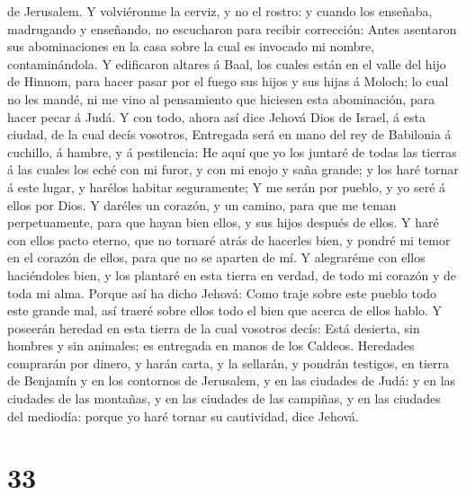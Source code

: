 de Jerusalem.  Y volviéronme la cerviz, y no el rostro: y
cuando los enseñaba, madrugando y enseñando, no escucharon para recibir
corrección:  Antes asentaron sus abominaciones en la casa
sobre la cual es invocado mi nombre, contaminándola.  Y
edificaron altares á Baal, los cuales están en el valle del hijo de
Hinnom, para hacer pasar por el fuego sus hijos y sus hijas á Moloch; lo
cual no les mandé, ni me vino al pensamiento que hiciesen esta
abominación, para hacer pecar á Judá.  Y con todo, ahora
así dice Jehová Dios de Israel, á esta ciudad, de la cual decís
vosotros, Entregada será en mano del rey de Babilonia á cuchillo, á
hambre, y á pestilencia:  He aquí que yo los juntaré de
todas las tierras á las cuales los eché con mi furor, y con mi enojo y
saña grande; y los haré tornar á este lugar, y harélos habitar
seguramente;  Y me serán por pueblo, y yo seré á ellos por
Dios.  Y daréles un corazón, y un camino, para que me teman
perpetuamente, para que hayan bien ellos, y sus hijos después de ellos.
 Y haré con ellos pacto eterno, que no tornaré atrás de
hacerles bien, y pondré mi temor en el corazón de ellos, para que no se
aparten de mí.  Y alegraréme con ellos haciéndoles bien, y
los plantaré en esta tierra en verdad, de todo mi corazón y de toda mi
alma.  Porque así ha dicho Jehová: Como traje sobre este
pueblo todo este grande mal, así traeré sobre ellos todo el bien que
acerca de ellos hablo.  Y poseerán heredad en esta tierra
de la cual vosotros decís: Está desierta, sin hombres y sin animales; es
entregada en manos de los Caldeos.  Heredades comprarán por
dinero, y harán carta, y la sellarán, y pondrán testigos, en tierra de
Benjamín y en los contornos de Jerusalem, y en las ciudades de Judá: y
en las ciudades de las montañas, y en las ciudades de las campiñas, y en
las ciudades del mediodía: porque yo haré tornar su cautividad, dice
Jehová.

\hypertarget{section-32}{%
\section{33}\label{section-32}}

